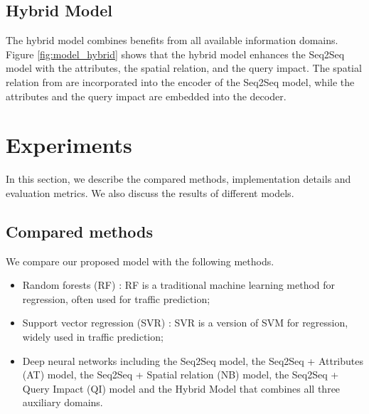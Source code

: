 \subsection{Hybrid Model}

The hybrid model combines benefits from all available information domains. Figure  \ref{fig:model_hybrid} shows that the hybrid model enhances the Seq2Seq model with the attributes, the spatial relation, and the query impact. The spatial relation from  are incorporated into the encoder of the Seq2Seq model, while the attributes  and the query impact  are embedded into the decoder.

\section{Experiments}
\label{experiments}
In this section, we describe the compared methods, implementation details and evaluation metrics. We also discuss the results of different models.
\subsection{Compared methods}
\label{comparedmethods}

We compare our proposed model with the following methods.
\begin{itemize}
\item Random forests (RF) \cite{leshem2007traffic}: RF is a traditional machine learning method for regression, often used for traffic prediction;
\item Support vector regression  (SVR) \cite{jin2007simultaneously}: SVR is a version of SVM for regression, widely used in traffic prediction;
\item Deep neural networks including the Seq2Seq model, the Seq2Seq + Attributes  (AT) model, the Seq2Seq + Spatial relation  (NB) model, the Seq2Seq + Query Impact  (QI) model and the Hybrid Model that combines all three auxiliary domains.
\end{itemize}

